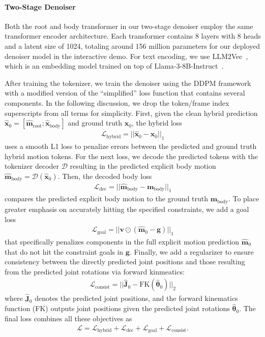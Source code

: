 \paragraph{Two-Stage Denoiser} 
Both the root and body transformer in our two-stage denoiser employ the same transformer encoder architecture. Each transformer contains 8 layers with 8 heads and a latent size of 1024, totaling around 156 million parameters for our deployed denoiser model in the interactive demo. 
For text encoding, we use LLM2Vec~\cite{reddy2024llm2vec}, which is an embedding model trained on top of Llama-3-8B-Instruct~\cite{llama3modelcard}.

After training the tokenizer, we train the denoiser using the DDPM framework~\cite{ho2020denoising} with a modified version of the ``simplified'' loss function that contains several components. In the following discussion, we drop the token/frame index superscripts from all terms for simplicity.
First, given the clean hybrid prediction $\hat{\mathbf{x}}_0 = [\hat{\mathbf{m}}_{\text{root}}; \hat{\mathbf{x}}_{\text{body}}]$ and ground truth $\mathbf{x}_0$, the hybrid loss
\begin{align}
    \mathcal{L}_\text{hybrid} = || \hat{\mathbf{x}}_0 - \mathbf{x}_0 ||_1
\end{align}
uses a smooth L1 loss \cite{girshickFastRCNN2015} to penalize errors between the predicted and ground truth hybrid motion tokens. 
For the next loss, we decode the predicted tokens with the tokenizer decoder $\mathcal{D}$ resulting in the predicted explicit body motion $\hat{\mathbf{m}}_\text{body} = \mathcal{D}(\hat{\mathbf{x}}_0)$. Then, the decoded body loss 
\begin{align}
    \mathcal{L}_\text{dec} = || \hat{\mathbf{m}}_\text{body} - \mathbf{m}_\text{body} ||_1
\end{align}
compares the predicted explicit body motion to the ground truth $\mathbf{m}_\text{body}$. 
To place greater emphasis on accurately hitting the specified constraints, we add a goal loss
\begin{align}
    \mathcal{L}_\text{goal} = || \mathbf{v} \odot (\hat{\mathbf{m}}_0 - \mathbf{g}) ||_1
\end{align}
that specifically penalizes components in the full explicit motion prediction $\hat{\mathbf{m}}_0$ that do not hit the constraint goals in $\mathbf{g}$. 
Finally, we add a regularizer to ensure consistency between the directly predicted joint positions and those resulting from the predicted joint rotations via forward kinmeatics:
\begin{align}
    \mathcal{L}_\text{consist} = || \hat{\mathbf{J}}_0 - \text{FK}(\hat{\boldsymbol{\theta}}_0) ||_2
\end{align}
where $\hat{\mathbf{J}}_0$ denotes the predicted joint positions, and the forward kinematics function (FK) outputs joint positions given the predicted joint rotations $\hat{\boldsymbol{\theta}}_0$.
The final loss combines all these objectives as
\begin{align}
    \mathcal{L} = \mathcal{L}_\text{hybrid} + \mathcal{L}_\text{dec} + \mathcal{L}_\text{goal} + \mathcal{L}_\text{consist}.
\end{align}

